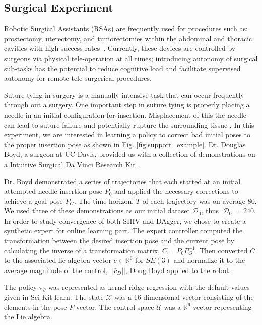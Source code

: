 \documentclass[10pt, conference]{ieeeconf}      %
\begin{document}
\subsection{Surgical Experiment}
Robotic Surgical Assistants (RSAs) are frequently used for procedures such as: prostectomy, uterectomy, and tumorectomies within the abdominal and thoracic cavities with high success rates~\cite{van2013laparoscopic,darzi2004impact}. Currently, these devices are controlled by surgeons via physical tele-operation at all times; introducing autonomy of surgical sub-tasks has the potential to reduce cognitive load and facilitate supervised autonomy for remote tele-surgerical procedures.

Suture tying in surgery is a manually intensive task that can occur frequently through out a surgery. One important step
in suture tying is properly placing a needle in an initial configuration for insertion. Misplacement of this the needle
can lead to suture failure and potentially rupture the surrounding tissue \cite{liu2015optimal}. In this experiment, we
are interested in learning a policy to correct bad initial poses to the proper insertion pose as shown in Fig.
\ref{fig:support_example}. Dr. Douglas Boyd, a surgeon at UC Davis, provided us with a collection of demonstrations on a Intuitive Surgical Da Vinci Research Kit \cite{AnnualReport2014}.

Dr. Boyd demonstrated a series of trajectories that each started at an initial attempted needle insertion pose $P_0$ and
applied the necessary corrections to achieve a goal pose $P_G$. The time horizon, $T$ of each trajectory was on average 80.  We used three of these demonstrations as our initial
dataset $\mathcal{D}_0$, thus $|\mathcal{D}_0| = 240$. In order to study convergence of both SHIV and DAgger, we chose to create a synthetic expert for online learning part. The expert controller computed the transformation between the desired insertion pose and the current pose  by calculating the inverse of a transformation matrix, $C = P_0P_G^{-1}$. Then converted $C$ to the associated lie algebra vector $c \in \mathbb{R}^6$ for $SE(3)$ and normalize it to the average magnitude of the control,  $||\bar{c}_D||$, Doug Boyd applied to the robot. 

The policy $\pi_{\theta}$ was represented as kernel ridge regression with the default values given in Sci-Kit learn. The state $\mathcal{X}$ was  a 16 dimensional vector consisting of the elements in the pose $P$ vector. The control space $\mathcal{U}$ was a $\mathbb{R}^6$ vector representing the Lie algebra. 
\end{document}
